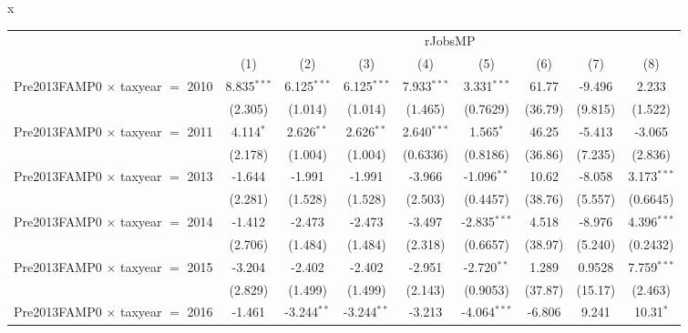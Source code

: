 x
\begingroup
\centering
\begin{tabular}{lcccccccc}
   \toprule
    & \multicolumn{8}{c}{rJobsMP}\\
                                           & (1)           & (2)            & (3)            & (4)            & (5)            & (6)           & (7)           & (8)\\  
   \midrule 
   Pre2013FAMP0 $\times$ taxyear $=$ 2010  & 8.835$^{***}$ & 6.125$^{***}$  & 6.125$^{***}$  & 7.933$^{***}$  & 3.331$^{***}$  & 61.77         & -9.496        & 2.233\\   
                                           & (2.305)       & (1.014)        & (1.014)        & (1.465)        & (0.7629)       & (36.79)       & (9.815)       & (1.522)\\   
   Pre2013FAMP0 $\times$ taxyear $=$ 2011  & 4.114$^{*}$   & 2.626$^{**}$   & 2.626$^{**}$   & 2.640$^{***}$  & 1.565$^{*}$    & 46.25         & -5.413        & -3.065\\   
                                           & (2.178)       & (1.004)        & (1.004)        & (0.6336)       & (0.8186)       & (36.86)       & (7.235)       & (2.836)\\   
   Pre2013FAMP0 $\times$ taxyear $=$ 2013  & -1.644        & -1.991         & -1.991         & -3.966         & -1.096$^{**}$  & 10.62         & -8.058        & 3.173$^{***}$\\   
                                           & (2.281)       & (1.528)        & (1.528)        & (2.503)        & (0.4457)       & (38.76)       & (5.557)       & (0.6645)\\   
   Pre2013FAMP0 $\times$ taxyear $=$ 2014  & -1.412        & -2.473         & -2.473         & -3.497         & -2.835$^{***}$ & 4.518         & -8.976        & 4.396$^{***}$\\   
                                           & (2.706)       & (1.484)        & (1.484)        & (2.318)        & (0.6657)       & (38.97)       & (5.240)       & (0.2432)\\   
   Pre2013FAMP0 $\times$ taxyear $=$ 2015  & -3.204        & -2.402         & -2.402         & -2.951         & -2.720$^{**}$  & 1.289         & 0.9528        & 7.759$^{***}$\\   
                                           & (2.829)       & (1.499)        & (1.499)        & (2.143)        & (0.9053)       & (37.87)       & (15.17)       & (2.463)\\   
   Pre2013FAMP0 $\times$ taxyear $=$ 2016  & -1.461        & -3.244$^{**}$  & -3.244$^{**}$  & -3.213         & -4.064$^{***}$ & -6.806        & 9.241         & 10.31$^{*}$\\   

\end{tabular}
